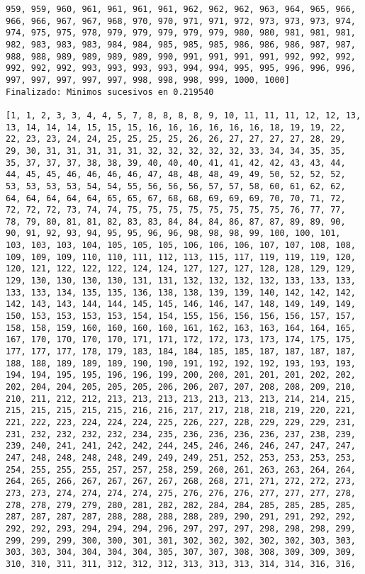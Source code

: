 \documentclass[11pt]{article}
\begin{document}
\begin{Verbatim}[commandchars=\\\{\}]
959, 959, 960, 961, 961, 961, 961, 962, 962, 962, 963, 964, 965, 966, 966, 966, 967, 967, 968, 970, 970, 971, 971, 972, 973, 973, 973, 974, 974, 975, 975, 978, 979, 979, 979, 979, 979, 980, 980, 981, 981, 981, 982, 983, 983, 983, 984, 984, 985, 985, 985, 986, 986, 986, 987, 987, 988, 988, 989, 989, 989, 989, 990, 991, 991, 991, 991, 992, 992, 992, 992, 992, 992, 993, 993, 993, 993, 994, 994, 995, 995, 996, 996, 996, 997, 997, 997, 997, 997, 998, 998, 998, 999, 1000, 1000]
Finalizado: Minimos sucesivos en 0.219540 

[1, 1, 2, 3, 3, 4, 4, 5, 7, 8, 8, 8, 8, 9, 10, 11, 11, 11, 12, 12, 13, 13, 14, 14, 14, 15, 15, 15, 16, 16, 16, 16, 16, 16, 18, 19, 19, 22, 22, 23, 23, 24, 24, 25, 25, 25, 25, 26, 26, 27, 27, 27, 27, 28, 29, 29, 30, 31, 31, 31, 31, 31, 32, 32, 32, 32, 32, 33, 34, 34, 35, 35, 35, 37, 37, 37, 38, 38, 39, 40, 40, 40, 41, 41, 42, 42, 43, 43, 44, 44, 45, 45, 46, 46, 46, 46, 47, 48, 48, 48, 49, 49, 50, 52, 52, 52, 53, 53, 53, 53, 54, 54, 55, 56, 56, 56, 57, 57, 58, 60, 61, 62, 62, 64, 64, 64, 64, 64, 65, 65, 67, 68, 68, 69, 69, 69, 70, 70, 71, 72, 72, 72, 72, 73, 74, 74, 75, 75, 75, 75, 75, 75, 75, 75, 76, 77, 77, 78, 79, 80, 81, 81, 82, 83, 83, 84, 84, 84, 86, 87, 87, 89, 89, 90, 90, 91, 92, 93, 94, 95, 95, 96, 96, 98, 98, 98, 99, 100, 100, 101, 103, 103, 103, 104, 105, 105, 105, 106, 106, 106, 107, 107, 108, 108, 109, 109, 109, 110, 110, 111, 112, 113, 115, 117, 119, 119, 119, 120, 120, 121, 122, 122, 122, 124, 124, 127, 127, 127, 128, 128, 129, 129, 129, 130, 130, 130, 130, 131, 131, 132, 132, 132, 132, 133, 133, 133, 133, 133, 134, 135, 135, 136, 138, 138, 139, 139, 140, 142, 142, 142, 142, 143, 143, 144, 144, 145, 145, 146, 146, 147, 148, 149, 149, 149, 150, 153, 153, 153, 153, 154, 154, 155, 156, 156, 156, 156, 157, 157, 158, 158, 159, 160, 160, 160, 160, 161, 162, 163, 163, 164, 164, 165, 167, 170, 170, 170, 170, 171, 171, 172, 172, 173, 173, 174, 175, 175, 177, 177, 177, 178, 179, 183, 184, 184, 185, 185, 187, 187, 187, 187, 188, 188, 189, 189, 189, 190, 190, 191, 192, 192, 192, 193, 193, 193, 194, 194, 195, 195, 196, 196, 199, 200, 200, 201, 201, 201, 202, 202, 202, 204, 204, 205, 205, 205, 206, 206, 207, 207, 208, 208, 209, 210, 210, 211, 212, 212, 213, 213, 213, 213, 213, 213, 213, 214, 214, 215, 215, 215, 215, 215, 215, 216, 216, 217, 217, 218, 218, 219, 220, 221, 221, 222, 223, 224, 224, 224, 225, 226, 227, 228, 229, 229, 229, 231, 231, 232, 232, 232, 232, 234, 235, 236, 236, 236, 236, 237, 238, 239, 239, 240, 241, 241, 242, 242, 244, 245, 246, 246, 246, 247, 247, 247, 247, 248, 248, 248, 248, 249, 249, 249, 251, 252, 253, 253, 253, 253, 254, 255, 255, 255, 257, 257, 258, 259, 260, 261, 263, 263, 264, 264, 264, 265, 266, 267, 267, 267, 267, 268, 268, 271, 271, 272, 272, 273, 273, 273, 274, 274, 274, 274, 275, 276, 276, 276, 277, 277, 277, 278, 278, 278, 279, 279, 280, 281, 282, 282, 284, 284, 285, 285, 285, 285, 287, 287, 287, 287, 288, 288, 288, 288, 289, 290, 291, 291, 292, 292, 292, 292, 293, 294, 294, 294, 296, 297, 297, 297, 298, 298, 298, 299, 299, 299, 299, 300, 300, 301, 301, 302, 302, 302, 302, 302, 303, 303, 303, 303, 304, 304, 304, 304, 305, 307, 307, 308, 308, 309, 309, 309, 310, 310, 311, 311, 312, 312, 312, 313, 313, 313, 314, 314, 316, 316, 
\end{Verbatim}
\end{document}

